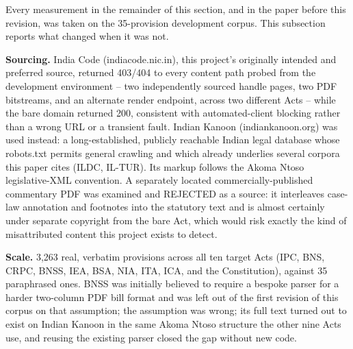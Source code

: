 \documentclass[conference]{IEEEtran}
\begin{document}
Every measurement in the remainder of this section, and in the paper before
this revision, was taken on the 35-provision development corpus. This
subsection reports what changed when it was not.

\textbf{Sourcing.} India Code (indiacode.nic.in), this project's originally
intended and preferred source, returned 403/404 to every content path probed
from the development environment -- two independently sourced handle pages,
two PDF bitstreams, and an alternate render endpoint, across two different
Acts -- while the bare domain returned 200, consistent with automated-client
blocking rather than a wrong URL or a transient fault. Indian Kanoon
(indiankanoon.org) was used instead: a long-established, publicly reachable
Indian legal database whose robots.txt permits general crawling and which
already underlies several corpora this paper cites (ILDC, IL-TUR). Its markup
follows the Akoma Ntoso legislative-XML convention. A separately located
commercially-published commentary PDF was examined and REJECTED as a source:
it interleaves case-law annotation and footnotes into the statutory text and
is almost certainly under separate copyright from the bare Act, which would
risk exactly the kind of misattributed content this project exists to detect.

\textbf{Scale.} 3{,}263 real, verbatim provisions across all ten target Acts
(IPC, BNS, CRPC, BNSS, IEA, BSA, NIA, ITA, ICA, and the Constitution), against
35 paraphrased ones. BNSS was initially believed to require a bespoke parser
for a harder two-column PDF bill format and was left out of the first
revision of this corpus on that assumption; the assumption was wrong; its
full text turned out to exist on Indian Kanoon in the same Akoma Ntoso
structure the other nine Acts use, and reusing the existing parser closed the
gap without new code.
\end{document}
